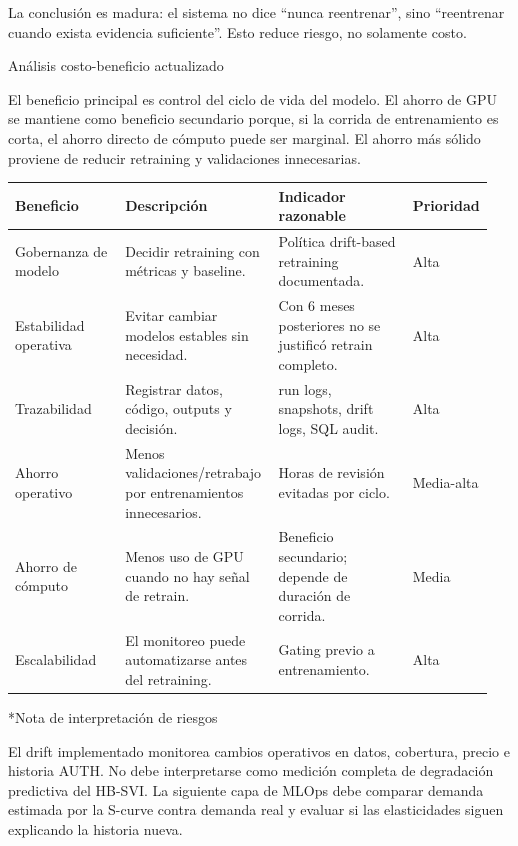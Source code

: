 \documentclass[11pt,letterpaper]{article}
\makeatletter
\renewcommand\section{\@startsection{section}{1}{\z@}
  {-3.5ex \@plus -1ex \@minus -.2ex}
  {2.3ex \@plus .2ex}
  {\Large\bfseries\sffamily\color{azulTec}}}
\renewcommand\subsection{\@startsection{subsection}{2}{\z@}
  {-3.25ex \@plus -1ex \@minus -.2ex}
  {1.5ex \@plus .2ex}
  {\large\bfseries\sffamily\color{azulTec}}}
\makeatother
\begin{document}
La conclusión es madura: el sistema no dice ``nunca reentrenar'', sino ``reentrenar cuando exista evidencia suficiente''. Esto reduce riesgo, no solamente costo.

\section{Análisis costo-beneficio actualizado}

El beneficio principal es control del ciclo de vida del modelo. El ahorro de GPU se mantiene como beneficio secundario porque, si la corrida de entrenamiento es corta, el ahorro directo de cómputo puede ser marginal. El ahorro más sólido proviene de reducir retraining y validaciones innecesarias.

\begin{tabularx}{\linewidth}{L{0.23\linewidth}L{0.32\linewidth}L{0.28\linewidth}L{0.12\linewidth}}
\toprule
\textbf{Beneficio} & \textbf{Descripción} & \textbf{Indicador razonable} & \textbf{Prioridad} \\
\midrule
Gobernanza de modelo & Decidir retraining con métricas y baseline. & Política drift-based retraining documentada. & Alta \\
Estabilidad operativa & Evitar cambiar modelos estables sin necesidad. & Con 6 meses posteriores no se justificó retrain completo. & Alta \\
Trazabilidad & Registrar datos, código, outputs y decisión. & run logs, snapshots, drift logs, SQL audit. & Alta \\
Ahorro operativo & Menos validaciones/retrabajo por entrenamientos innecesarios. & Horas de revisión evitadas por ciclo. & Media-alta \\
Ahorro de cómputo & Menos uso de GPU cuando no hay señal de retrain. & Beneficio secundario; depende de duración de corrida. & Media \\
Escalabilidad & El monitoreo puede automatizarse antes del retraining. & Gating previo a entrenamiento. & Alta \\
\bottomrule
\end{tabularx}

\subsection*{Nota de interpretación de riesgos}

El drift implementado monitorea cambios operativos en datos, cobertura, precio e historia AUTH. No debe interpretarse como medición completa de degradación predictiva del HB-SVI. La siguiente capa de MLOps debe comparar demanda estimada por la S-curve contra demanda real y evaluar si las elasticidades siguen explicando la historia nueva.
\end{document}
